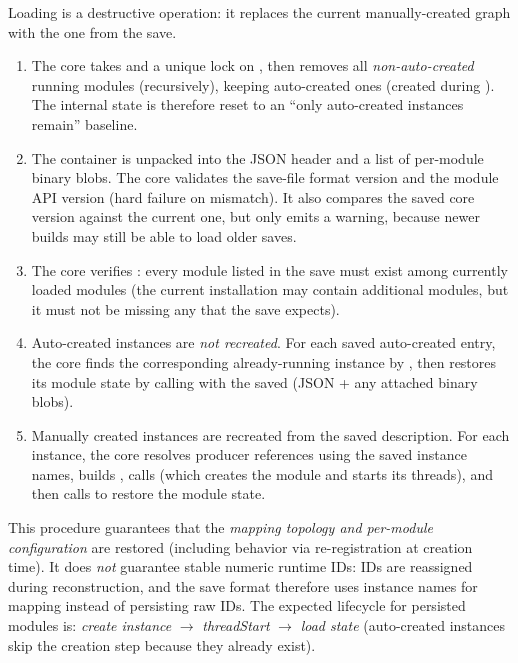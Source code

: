 Loading is a destructive operation: it replaces the current manually-created graph with the one from the save.
\begin{enumerate}
    \item The core takes  and a unique lock on , then removes all \emph{non-auto-created} running modules (recursively), keeping auto-created ones (created during ). The internal state is therefore reset to an ``only auto-created instances remain'' baseline.
    \item The container is unpacked into the JSON header and a list of per-module binary blobs. The core validates the save-file format version and the module API version (hard failure on mismatch). It also compares the saved core version against the current one, but only emits a warning, because newer builds may still be able to load older saves.
    \item The core verifies : every module listed in the save must exist among currently loaded modules (the current installation may contain additional modules, but it must not be missing any that the save expects).
    \item Auto-created instances are \emph{not recreated}. For each saved auto-created entry, the core finds the corresponding already-running instance by , then restores its module state by calling  with the saved  (JSON + any attached binary blobs).
    \item Manually created instances are recreated from the saved description. For each instance, the core resolves producer references using the saved instance names, builds , calls  (which creates the module and starts its threads), and then calls  to restore the module state.
\end{enumerate}

This procedure guarantees that the \emph{mapping topology and per-module configuration} are restored (including  behavior via re-registration at creation time). It does \emph{not} guarantee stable numeric runtime IDs: IDs are reassigned during reconstruction, and the save format therefore uses instance names for mapping instead of persisting raw IDs. The expected lifecycle for persisted modules is: \emph{create instance} $\rightarrow$ \emph{threadStart} $\rightarrow$ \emph{load state} (auto-created instances skip the creation step because they already exist).




